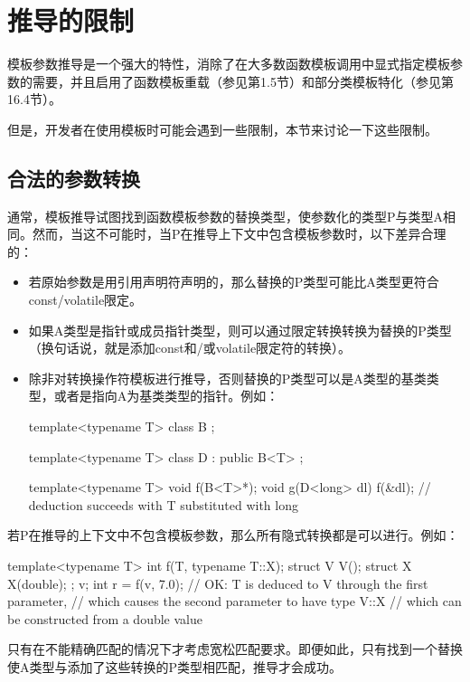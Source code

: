 \section{推导的限制}


模板参数推导是一个强大的特性，消除了在大多数函数模板调用中显式指定模板参数的需要，并且启用了函数模板重载（参见第1.5节）和部分类模板特化（参见第16.4节）。

但是，开发者在使用模板时可能会遇到一些限制，本节来讨论一下这些限制。

\subsection{合法的参数转换}

通常，模板推导试图找到函数模板参数的替换类型，使参数化的类型P与类型A相同。然而，当这不可能时，当P在推导上下文中包含模板参数时，以下差异合理的：

\begin{itemize}
\item 
若原始参数是用引用声明符声明的，那么替换的P类型可能比A类型更符合const/volatile限定。

\item 
如果A类型是指针或成员指针类型，则可以通过限定转换转换为替换的P类型（换句话说，就是添加const和/或volatile限定符的转换）。

\item 
除非对转换操作符模板进行推导，否则替换的P类型可以是A类型的基类类型，或者是指向A为基类类型的指针。例如：

\begin{cpp}
template<typename T>
class B {
};

template<typename T>
class D : public B<T> {
};

template<typename T> void f(B<T>*);
void g(D<long> dl)
{
	f(&dl); // deduction succeeds with T substituted with long
}
\end{cpp}
\end{itemize}

若P在推导的上下文中不包含模板参数，那么所有隐式转换都是可以进行。例如：

\begin{cpp}
template<typename T> int f(T, typename T::X);
struct V {
	V();
	struct X {
		X(double);
	};
} v;
int r = f(v, 7.0); // OK: T is deduced to V through the first parameter,
					// which causes the second parameter to have type V::X
					// which can be constructed from a double value
\end{cpp}

只有在不能精确匹配的情况下才考虑宽松匹配要求。即便如此，只有找到一个替换使A类型与添加了这些转换的P类型相匹配，推导才会成功。

